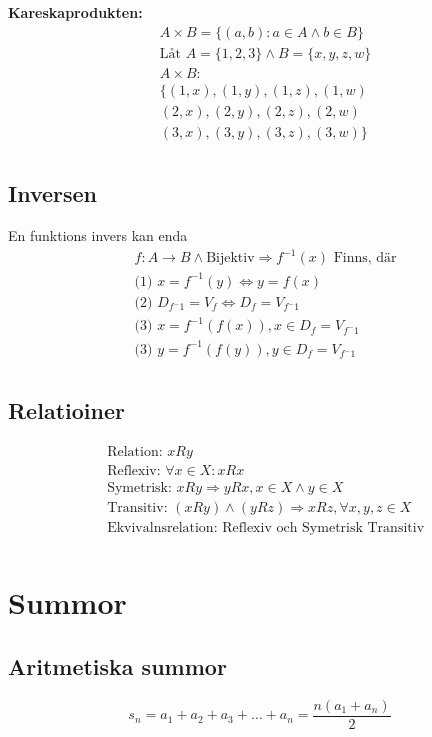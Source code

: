 \begin{multicols}{2}
\textbf{Kareskaprodukten:}
\begin{align*}
  &A \times B = \{ (a,b): a \in A \land b \in B \} \\
  &\text{Låt } A = \{ 1,2,3 \} \land B = \{ x,y,z,w \} \\
  &A \times B : \\
  &\{ (1,x), (1,y), (1,z), (1,w) \\
  &(2,x), (2,y), (2,z), (2,w) \\
  &(3,x), (3,y), (3,z), (3,w) \} \\
\end{align*}

\subsection{Inversen}
En funktions invers kan enda
\begin{align*}
  & f: A \to B \land \text{Bijektiv} \Rightarrow f^{-1}(x) \text{ Finns, där}  \\
  &\text{(1) }  x = f^{-1}(y) \Leftrightarrow y = f(x) \\
  &\text{(2) }  D_{f^-1} = V_f \Leftrightarrow D_f = V_{f^-1} \\
  &\text{(3) }  x = f^{-1}(f(x)), x \in D_f = V_{f^-1} \\ 
  &\text{(3) }  y = f^{-1}(f(y)), y \in D_f = V_{f^-1} \\ 
\end{align*}

\subsection{Relatioiner}
\begin{align*}
  &\text{Relation: } xRy \\
  &\text{Reflexiv: } \forall x \in X: xRx \\
  &\text{Symetrisk: } xRy \Rightarrow yRx, x \in X \land y \in X \\
  &\text{Transitiv: } (xRy) \land (yRz) \Rightarrow xRz, \forall x,y,z \in X  \\
  &\text{Ekvivalnsrelation: Reflexiv och Symetrisk Transitiv} \\
\end{align*}


\section{Summor}
\subsection{Aritmetiska summor}
\begin{equation*}
s _ { n } = a _ { 1 } + a _ { 2 } + a _ { 3 } + \ldots + a _ { n } = \frac { n \left( a _ { 1 } + a _ { n } \right) } { 2 }
\end{equation*}



\end{multicols}
